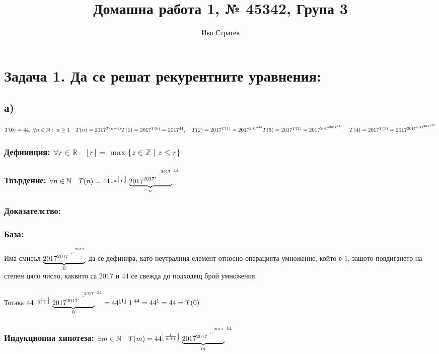 \documentclass[14pt]{extarticle}
\title{Домашна работа 1, № 45342, Група 3}
\author{Иво Стратев}
\newcommand{\N}{\mathbb{N}}
\newcommand{\Z}{\mathbb{Z}}
\newcommand{\R}{\mathbb{R}}
\begin{document}
\maketitle
\section*{Задача 1. Да се решат рекурентните уравнения:	}
\subsection*{а)}
\(T(0) = 44, \; \forall n \in \N: \; n \geq 1 \quad T(n) = 2017^{T(n - 1)} \\\\
T(1) = 2017^{T(0)} = 2017^{44}, \quad T(2) = 2017^{T(1)} = 2017^{2017^{44}} \\\\
T(3) = 2017^{T(2)} = 2017^{2017^{2017^{44}}}, \quad T(4) = 2017^{T(3)} = 2017^{2017^{2017^{2017^{44}}}}\)
\subsubsection*{Дефиниция: \(\forall r \in \R \quad \lfloor r \rfloor = \max\{z \in \Z \; | \; z \leq r\}\)}
\subsubsection*{Твърдение: \(\forall n \in \N \quad T(n) = 44^{\left\lfloor \frac{1}{n + 1} \right\rfloor}\;{\underbrace{2017^{2017^{\Large{\iddots}^{2017}}}}_n}^{\;44}\)}
\subsubsection*{Доказателство:}
\subsubsection*{База:}
Има смисъл \({\underbrace{2017^{2017^{\Large{\iddots}^{2017}}}}_0}\) да се дефинира, като неутралния елемент относно операцията умножение, който е \(1\), защото повдигането на степен цяло число, каквито са \(2017\) и \(44\) се свежда до подходящ брой умножения. \\\\
Тогава \(44^{\left\lfloor \frac{1}{0 + 1} \right\rfloor}\;{\underbrace{2017^{2017^{\Large{\iddots}^{2017}}}}_0}^{\;44} = 
44^{\left\lfloor 1 \right\rfloor}\;1^{\;44} = 44^1 = 44 = T(0)\)
\subsubsection*{Индукционна хипотеза: \(\exists m \in \N \quad T(m) = 44^{\left\lfloor \frac{1}{m + 1} \right\rfloor}\;{\underbrace{2017^{2017^{\Large{\iddots}^{2017}}}}_m}^{\;44}\)}
\end{document}
